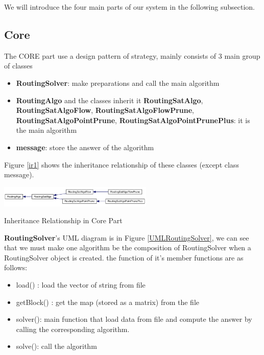 \documentclass[twocolumn]{article}
\begin{document}
We will introduce the four main parts of our system in the following subsection.

\subsection{Core}

The CORE part use a design pattern of strategy, mainly consists of 3 main group of classes

\begin{itemize}
    \item \textbf{RoutingSolver}: make preparations and call the main algorithm
    \item \textbf{RoutingAlgo} and the classes inherit it \textbf{RoutingSatAlgo}, \textbf{RoutingSatAlgoFlow}, \textbf{RoutingSatAlgoFlowPrune}, \textbf{RoutingSatAlgoPointPrune}, \textbf{RoutingSatAlgoPointPrunePlus}: it is the main algorithm
    \item \textbf{message}: store the answer of the algorithm
\end{itemize}

Figure \ref{ir1} shows the inheritance relationship of these classes (except class message).

\begin{center}
\makeatletter
\def\@captype{figure}
\makeatother
\includegraphics [height=1cm]{ir1}
\caption{Inheritance Relationship in Core Part}
\label{ir1}
\end{center}

\textbf{RoutingSolver}'s UML diagram is in Figure \ref{UMLRoutingSolver}, we can see that we must make one algorithm be the composition of RoutingSolver when a RoutingSolver object is created. the function of it's member functions are as follows:

\begin{itemize}
    \item load() : load the vector of string from file
    \item getBlock() : get the map (stored as a matrix) from the file
    \item solver(): main function that load data from file and compute the answer by calling the corresponding algorithm.
    \item solve(): call the algorithm
\end{itemize}
\end{document}

